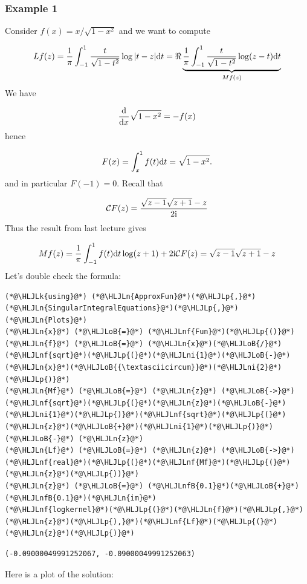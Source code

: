 \documentclass[12pt,landscape]{article}
\newcommand{\HLJLk}[1]{\textcolor[RGB]{148,91,176}{\textbf{#1}}}
\newcommand{\HLJLn}[1]{#1}
\newcommand{\HLJLnf}[1]{\textcolor[RGB]{66,102,213}{#1}}
\newcommand{\HLJLnfB}[1]{\textcolor[RGB]{59,151,46}{#1}}
\newcommand{\HLJLni}[1]{\textcolor[RGB]{59,151,46}{#1}}
\newcommand{\HLJLoB}[1]{\textcolor[RGB]{102,102,102}{\textbf{#1}}}
\newcommand{\HLJLp}[1]{#1}
\def\D{ {\rm d} }
\def\I{ {\rm i} }
\def\CC{ {\cal C} }
\def\dx{\D x}
\begin{document}
{\subsubsection{Example 1}
Consider $f(x) = x/\sqrt{1-x^2}$ and we want to compute

\[
L f(z) = {1 \over \pi} \int_{-1}^1 {t \over \sqrt{1-t^2}} \log|t-z| \D t = \Re \underbrace{{1 \over \pi} \int_{-1}^1 {t \over \sqrt{1-t^2}} \log(z-t) \D t }_{M f(z)}
\]
We have

\[
{\D \over \dx} \sqrt{1-x^2} = - f(x)
\]
hence

\[
F(x) = \int_x^1 f(t) \D t = \sqrt{1-x^2}.
\]
and in particular $F(-1) = 0$. Recall that

\[
\CC F(z) = {\sqrt{z-1} \sqrt{z+1} - z\over 2 \I}
\]
Thus the result from last lecture gives

\[
M f(z) = {1 \over \pi} \int_{-1}^1 f(t) \D t \log(z+1)+ 2 \I \CC F(z) = \sqrt{z-1} \sqrt{z+1} - z
\]
Let's double check the formula:


\begin{lstlisting}
(*@\HLJLk{using}@*) (*@\HLJLn{ApproxFun}@*)(*@\HLJLp{,}@*) (*@\HLJLn{SingularIntegralEquations}@*)(*@\HLJLp{,}@*) (*@\HLJLn{Plots}@*)
(*@\HLJLn{x}@*) (*@\HLJLoB{=}@*) (*@\HLJLnf{Fun}@*)(*@\HLJLp{()}@*)
(*@\HLJLn{f}@*) (*@\HLJLoB{=}@*) (*@\HLJLn{x}@*)(*@\HLJLoB{/}@*)(*@\HLJLnf{sqrt}@*)(*@\HLJLp{(}@*)(*@\HLJLni{1}@*)(*@\HLJLoB{-}@*)(*@\HLJLn{x}@*)(*@\HLJLoB{{\textasciicircum}}@*)(*@\HLJLni{2}@*)(*@\HLJLp{)}@*)
(*@\HLJLn{Mf}@*) (*@\HLJLoB{=}@*) (*@\HLJLn{z}@*) (*@\HLJLoB{->}@*) (*@\HLJLnf{sqrt}@*)(*@\HLJLp{(}@*)(*@\HLJLn{z}@*)(*@\HLJLoB{-}@*)(*@\HLJLni{1}@*)(*@\HLJLp{)}@*)(*@\HLJLnf{sqrt}@*)(*@\HLJLp{(}@*)(*@\HLJLn{z}@*)(*@\HLJLoB{+}@*)(*@\HLJLni{1}@*)(*@\HLJLp{)}@*) (*@\HLJLoB{-}@*) (*@\HLJLn{z}@*)
(*@\HLJLn{Lf}@*) (*@\HLJLoB{=}@*) (*@\HLJLn{z}@*) (*@\HLJLoB{->}@*) (*@\HLJLnf{real}@*)(*@\HLJLp{(}@*)(*@\HLJLnf{Mf}@*)(*@\HLJLp{(}@*)(*@\HLJLn{z}@*)(*@\HLJLp{))}@*)
(*@\HLJLn{z}@*) (*@\HLJLoB{=}@*) (*@\HLJLnfB{0.1}@*)(*@\HLJLoB{+}@*)(*@\HLJLnfB{0.1}@*)(*@\HLJLn{im}@*)
(*@\HLJLnf{logkernel}@*)(*@\HLJLp{(}@*)(*@\HLJLn{f}@*)(*@\HLJLp{,}@*)(*@\HLJLn{z}@*)(*@\HLJLp{),}@*)(*@\HLJLnf{Lf}@*)(*@\HLJLp{(}@*)(*@\HLJLn{z}@*)(*@\HLJLp{)}@*)
\end{lstlisting}

\begin{lstlisting}
(-0.09000049991252067, -0.09000049991252063)
\end{lstlisting}


Here is a plot of the solution:


}
\end{document}
